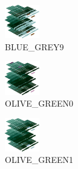 \hspace{0.1cm}
\begin{minipage}[b]{0.15\linewidth}
\begin{figure}[H]                                                          
  \centering                                                             
  \begin{adjustbox}{width=1.5cm,center}                                   
  \includegraphics[width=1.5cm]{src/colorspace_colourflow/flows/colourflow_175-45.png}%
  \end{adjustbox}                                                        
\caption*{BLUE\_GREY9}                                           
\end{figure}                                                               
\end{minipage}
\hspace{0.1cm}
\begin{minipage}[b]{0.15\linewidth}
\begin{figure}[H]                                                          
  \centering                                                             
  \begin{adjustbox}{width=1.5cm,center}                                   
  \includegraphics[width=1.5cm]{src/colorspace_colourflow/flows/colourflow_176-45.png}%
  \end{adjustbox}                                                        
\caption*{OLIVE\_GREEN0}                                           
\end{figure}                                                               
\end{minipage}
\hspace{0.1cm}
\begin{minipage}[b]{0.15\linewidth}
\begin{figure}[H]                                                          
  \centering                                                             
  \begin{adjustbox}{width=1.5cm,center}                                   
  \includegraphics[width=1.5cm]{src/colorspace_colourflow/flows/colourflow_177-45.png}%
  \end{adjustbox}                                                        
\caption*{OLIVE\_GREEN1}                                           
\end{figure}                                                               
\end{minipage}
